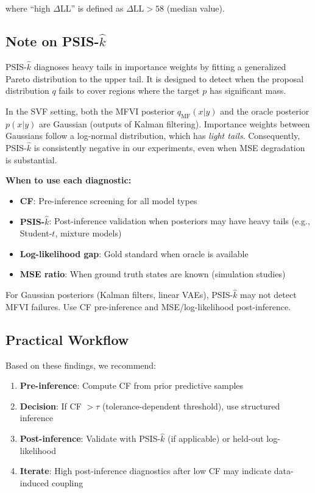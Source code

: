 \documentclass[10pt]{article} %
\theoremstyle{plain}
\theoremstyle{definition}
\begin{document}
\noindent where ``high $\Delta$LL'' is defined as $\Delta\text{LL} > 58$ (median value).

\subsection{Note on PSIS-$\hat{k}$}
\label{sec:psis-note}

PSIS-$\hat{k}$ \citep{vehtari2017practical} diagnoses heavy tails in importance weights by fitting a generalized Pareto distribution to the upper tail. It is designed to detect when the proposal distribution $q$ fails to cover regions where the target $p$ has significant mass.

In the SVF setting, both the MFVI posterior $q_{\text{MF}}(x|y)$ and the oracle posterior $p(x|y)$ are Gaussian (outputs of Kalman filtering). Importance weights between Gaussians follow a log-normal distribution, which has \emph{light tails}. Consequently, PSIS-$\hat{k}$ is consistently negative in our experiments, even when MSE degradation is substantial.

\begin{tcolorbox}[colback=yellow!5!white, colframe=yellow!50!black, title=Diagnostic Selection Guide]
\textbf{When to use each diagnostic:}
\begin{itemize}[nosep]
    \item \textbf{CF}: Pre-inference screening for all model types
    \item \textbf{PSIS-$\hat{k}$}: Post-inference validation when posteriors may have heavy tails (e.g., Student-$t$, mixture models)
    \item \textbf{Log-likelihood gap}: Gold standard when oracle is available
    \item \textbf{MSE ratio}: When ground truth states are known (simulation studies)
\end{itemize}
For Gaussian posteriors (Kalman filters, linear VAEs), PSIS-$\hat{k}$ may not detect MFVI failures. Use CF pre-inference and MSE/log-likelihood post-inference.
\end{tcolorbox}

\subsection{Practical Workflow}

Based on these findings, we recommend:

\begin{enumerate}[nosep]
    \item \textbf{Pre-inference}: Compute CF from prior predictive samples
    \item \textbf{Decision}: If CF $> \tau$ (tolerance-dependent threshold), use structured inference
    \item \textbf{Post-inference}: Validate with PSIS-$\hat{k}$ (if applicable) or held-out log-likelihood
    \item \textbf{Iterate}: High post-inference diagnostics after low CF may indicate data-induced coupling
\end{enumerate}
\end{document}
